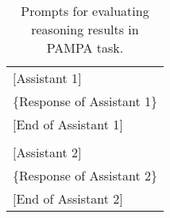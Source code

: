 \begin{table*}[ht!]
\begin{tcolorbox}
\begin{tabular}{p{.95\linewidth}}
        $[$Assistant 1$]$\\
        \{Response of Assistant 1\}\\
        $[$End of Assistant 1$]$\\
        \\
        $[$Assistant 2$]$\\
        \{Response of Assistant 2\}\\
        $[$End of Assistant 2$]$\\
    \end{tabular}
\end{tcolorbox}
\vspace{-0.1in}
\caption{Prompts for evaluating reasoning results in PAMPA task.}
\label{app:tab:prompts_pampa_eval}
\end{table*}
